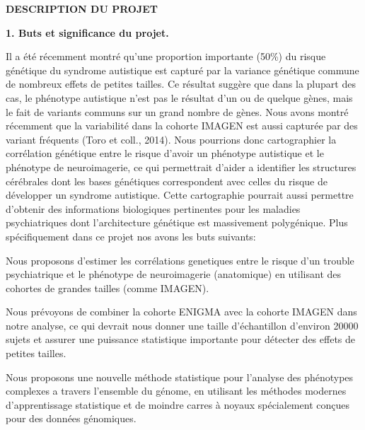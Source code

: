 \documentclass[12pt]{article}
\begin{document}
\begin{center}
{\large \bf DESCRIPTION DU PROJET}
\end{center}

\noindent
{\large \textbf{1. Buts et significance du projet.}}
\medskip

\noindent
Il a \'et\'e r\'ecemment montr\'e qu'une proportion importante (50\%) du risque g\'en\'etique du syndrome autistique est captur\'e par la variance g\'en\'etique commune de nombreux effets de petites tailles. Ce r\'esultat sugg\`ere que dans la plupart des cas, le ph\'enotype autistique n'est pas le r\'esultat d'un ou de quelque g\`enes, mais le fait de variants communs sur un grand nombre de g\`enes. Nous avons montr\'e r\'ecemment que la variabilit\'e dans la cohorte IMAGEN est aussi captur\'ee par des variant fr\'equents (Toro et coll., 2014). Nous pourrions donc cartographier la corr\'elation g\'en\'etique entre le risque d'avoir un ph\'enotype autistique et le ph\'enotype de neuroimagerie, ce qui permettrait d'aider a identifier les structures c\'er\'ebrales dont les bases g\'en\'etiques correspondent avec celles du risque de d\'evelopper un syndrome autistique. Cette cartographie pourrait aussi permettre d'obtenir des informations biologiques pertinentes pour les maladies psychiatriques dont l'architecture g\'en\'etique est massivement polyg\'enique. Plus sp\'ecifiquement dans ce projet nos avons les buts suivants:

\newlength{\adjitsepb}
\setlength{\adjitsepb}{0.06in}

\vspace{-0.075in}
\begin{list}{[]}{\setlength{\parsep}{0in}\setlength{\itemsep}{\adjitsepb}\setlength{\itemindent}{0in}}
	\item Nous proposons d'estimer les corr\'elations genetiques entre le risque d'un trouble psychiatrique et le ph\'enotype de neuroimagerie (anatomique) en utilisant des cohortes de grandes tailles (comme IMAGEN). 
	\item Nous pr\'evoyons de combiner la cohorte ENIGMA avec la cohorte IMAGEN dans notre analyse, ce qui devrait nous donner une taille d'\'echantillon d'environ 20000 sujets et assurer une puissance statistique importante pour d\'etecter des effets de petites tailles. 
	\item Nous proposons une nouvelle m\'ethode statistique pour l'analyse des ph\'enotypes complexes a travers l'ensemble du g\'enome, en utilisant les m\'ethodes modernes d'apprentissage statistique et de moindre carres \`a noyaux sp\'ecialement conçues pour des donn\'ees g\'enomiques. 
\end{list}
\end{document}
